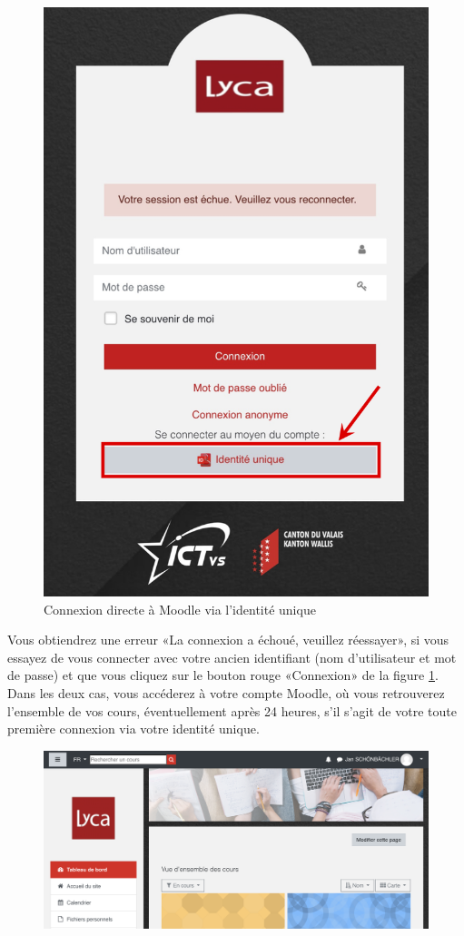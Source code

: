 \documentclass[10pt,a4paper]{report}
\begin{document}
\begin{figure} [H]
	\centering
	\includegraphics[width=0.48\linewidth]{images/connexion_moodle_21}
	\caption{Connexion directe à Moodle via l'identité unique}
	\label{fig:connexionMoodle21}
\end{figure}


\attention Vous obtiendrez une erreur «La connexion a échoué, veuillez réessayer», si vous essayez de vous connecter avec votre ancien identifiant (nom d'utilisateur et mot de passe) et que vous cliquez sur le bouton rouge «Connexion» de la figure \ref{fig:connexionMoodle21}. \\


Dans les deux cas, vous accéderez à votre compte Moodle, où vous retrouverez l'ensemble de vos cours, éventuellement après 24 heures, s'il s'agit de votre toute première connexion via votre identité unique.

\begin{figure}[H]
	\centering
	\includegraphics[width=.75\linewidth]{images/capture_moodle_lyca_2021}
	\caption{}
	\label{fig:capturemoodlelyca}
\end{figure}
\end{document}
